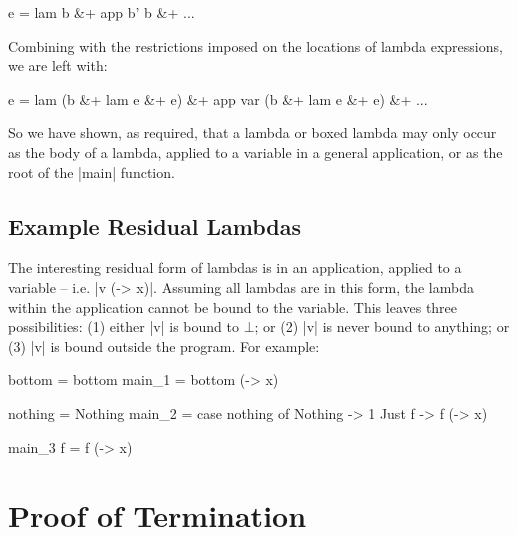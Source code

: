 \ignore\begin{code}
e = lam b &+ app b' b &+ ...
\end{code}

Combining with the restrictions imposed on the locations of lambda expressions, we are left with:

\ignore\begin{code}
e   = lam (b &+ lam e &+ e) &+ app var (b &+ lam e &+ e) &+ ...
\end{code}

So we have shown, as required, that a lambda or boxed lambda may only occur as the body of a lambda, applied to a variable in a general application, or as the root of the |main| function.

\subsection{Example Residual Lambdas}

The interesting residual form of lambdas is in an application, applied to a variable -- i.e. |v (\x -> x)|. Assuming all lambdas are in this form, the lambda within the application cannot be bound to the variable. This leaves three possibilities: (1) either |v| is bound to $\bot{}$; or (2) |v| is never bound to anything; or (3) |v| is bound outside the program. For example:

\begin{code}
bottom = bottom
main_1 = bottom (\x -> x)

nothing = Nothing
main_2 = case  nothing of
               Nothing  -> 1
               Just f   -> f (\x -> x)

main_3 f = f (\x -> x)
\end{code}

\section{Proof of Termination}
\label{sec:termination}

\begin{comment}
We can remove all data types by encoding them as functions, as described in \citet{naylor:reduceron}. If we then had a transformation which made the program first-order \textit{without} introducing any data types, we would end up with a program without data or closures, which is incapable of storing an unbounded amount of information. Since with higher-order functions we can implement a Turing machine \cite{turing:halting}, and without an unbounded store we cannot, such a transformation cannot exist.
\end{comment}

